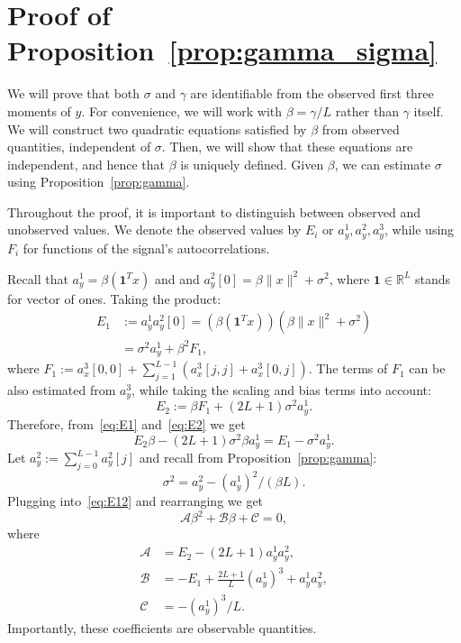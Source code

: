 \documentclass[english,11pt]{article}
\newcommand{\1}{\mathbf{1}}
\numberwithin{equation}{section}
\theoremstyle{plain}
\theoremstyle{definition}
\theoremstyle{remark}
\theoremstyle{plain}
\theoremstyle{remark}
\theoremstyle{plain}
\theoremstyle{plain}
\newcommand{\RL}{\mathbb{R}^L}
\newcommand{\one}{\mathbf{1}}
\begin{document}
\section{Proof of Proposition~\ref{prop:gamma_sigma}} \label{sec:proof_prop_gamma_sigma}

We will prove that both $\sigma$ and $\gamma$ are identifiable from the observed first three moments of $y$. For convenience, we will work with $\beta = \gamma / L$ rather than $\gamma$ itself. We will construct two quadratic equations satisfied by $\beta$ from observed quantities, independent of $\sigma$. Then, we will show that these equations are independent, and hence that $\beta$ is uniquely defined.  Given $\beta$, we can estimate $\sigma$ using Proposition~\ref{prop:gamma}.

Throughout the proof, it is important to distinguish between observed and unobserved values. 
We denote the observed values by $E_i$ or $a_y^1,a_y^2,a_y^3$, while using $F_i$ for functions of the signal's autocorrelations. 

Recall that $a_y^1 = \beta(\one^Tx)$ and  
and $a_y^2[0] = \beta\|x\|^2+\sigma^2$, where $\one\in\RL$ stands for vector of ones. Taking the product:
\begin{equation}\label{eq:E1}
\begin{split}
E_1 &:= a_y^1a_y^2[0] =  (\beta(\one^Tx))(\beta\|x\|^2+\sigma^2) \\
& = \sigma^2a_y^1 + \beta^2F_1,
\end{split}
\end{equation}
where $F_1 := a_x^3[0,0] + \sum_{j=1}^{L-1}(a_x^3[j,j] + a_x^3[0,j])$. 
The terms of $F_1$ can be also estimated from $a_y^3$, while taking the scaling and bias terms into account:
\begin{equation} \label{eq:E2}
E_2:= \beta F_1 + (2L+1)\sigma^2a_y^1.
\end{equation}
Therefore, from~\eqref{eq:E1} and~\eqref{eq:E2} we get
\begin{equation} \label{eq:E12}
E_2\beta -(2L+1)\sigma^2\beta a_y^1 = E_1-\sigma^2a_y^1.
\end{equation}
Let $a_y^2:=\sum_{j=0}^{L-1}a_y^2[j]$ and recall from Proposition~\ref{prop:gamma}:
\begin{equation} \label{eq:sigma2}
\sigma^2 = a_y^2 - (a^1_y)^2/(\beta L). 
\end{equation} 
Plugging into~\eqref{eq:E12} and rearranging we get 
\begin{equation} \label{eq:quad1}
\mathcal{A}\beta^2 + \mathcal{B}\beta + \mathcal{C} = 0,
\end{equation}
where 
\begin{align*}
\mathcal{A} &= E_2 - (2L+1)a_y^1a_y^2, \\ 
\mathcal{B} &= -E_1 + \frac{2L+1}{L}(a_y^1)^3 + a_y^1a_y^2  , \\
\mathcal{C} &= -(a_y^1)^3/L.
\end{align*}
Importantly, these coefficients are observable quantities. 
\end{document}

